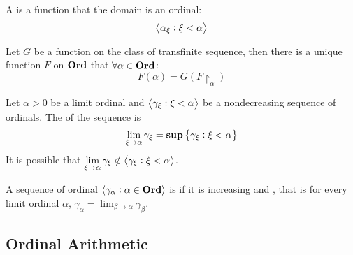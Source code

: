 \begin{definition}
    A  is a function that the domain is an ordinal:
    \begin{equation}
        \left< \alpha_\xi : \xi < \alpha \right>
    \end{equation}
\end{definition}

\begin{theorem}
    Let $G$ be a function on the class of transfinite sequence, then there is a unique function $F$ on $\mathbf{Ord}$ that $\forall \alpha \in \mathbf{Ord}$:
    \begin{equation}
        F(\alpha) = G(F\restriction_\alpha)
    \end{equation}
\end{theorem}

\begin{definition}
    Let $\alpha>0$ be a limit ordinal and $\left< \gamma_\xi : \xi < \alpha \right>$ be a nondecreasing sequence of ordinals. The  of the sequence is
    \begin{equation}
        \lim_{\xi \rightarrow \alpha} \gamma_\xi = \mathbf{sup} \set{\gamma_\xi : \xi < \alpha}
    \end{equation}
    It is possible that $\displaystyle \lim_{\xi \rightarrow \alpha} \gamma_\xi \notin \left< \gamma_\xi : \xi < \alpha \right>$.
\end{definition}

\begin{definition}
    A sequence of ordinal $\left< \gamma_\alpha : \alpha \in \mathbf{Ord} \right>$ is  if it is increasing and , that is for every limit ordinal $\alpha$, $\displaystyle \gamma_\alpha = \lim_{\beta \rightarrow \alpha} \gamma_\beta$.
\end{definition}



\subsection{Ordinal Arithmetic}

